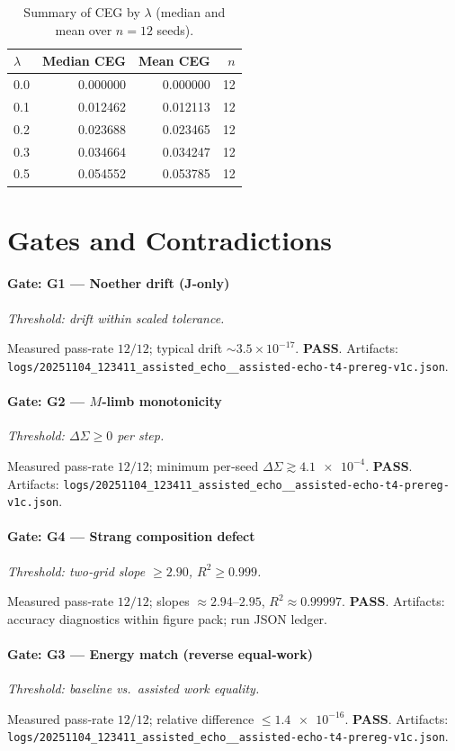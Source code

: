 \documentclass{article}
\newenvironment{vdmgate}[2]{%
  \paragraph{Gate: #1} \emph{Threshold: #2.}%
  \par\noindent}{\medskip}
\begin{document}
\begin{table}[t]
  \centering
  \caption{Summary of CEG by $\lambda$ (median and mean over $n=12$ seeds).}
  \label{tab:cegtable}
  \begin{tabular}{@{}lrrr@{}}
  \toprule
  $\lambda$ & Median CEG & Mean CEG & $n$ \\
  \midrule
  0.0 & 0.000000 & 0.000000 & 12 \\
  0.1 & 0.012462 & 0.012113 & 12 \\
  0.2 & 0.023688 & 0.023465 & 12 \\
  0.3 & 0.034664 & 0.034247 & 12 \\
  0.5 & 0.054552 & 0.053785 & 12 \\
  \bottomrule
  \end{tabular}
\end{table}

\section{Gates and Contradictions}
\label{sec:gates}

\begin{vdmgate}{G1 — Noether drift (J-only)}{drift within scaled tolerance}
Measured pass‑rate $12/12$; typical drift $\sim 3.5\times 10^{-17}$. \textbf{PASS}. Artifacts: \texttt{logs/20251104\_123411\_assisted\_echo\_\_assisted-echo-t4-prereg-v1c.json}.
\end{vdmgate}

\begin{vdmgate}{G2 — $M$‑limb monotonicity}{$\Delta \Sigma \ge 0$ per step}
Measured pass‑rate $12/12$; minimum per‑seed $\Delta \Sigma \gtrsim \num{4.1e-4}$. \textbf{PASS}. Artifacts: \texttt{logs/20251104\_123411\_assisted\_echo\_\_assisted-echo-t4-prereg-v1c.json}.
\end{vdmgate}

\begin{vdmgate}{G4 — Strang composition defect}{two‑grid slope $\ge 2.90$, $R^2 \ge 0.999$}
Measured pass‑rate $12/12$; slopes $\approx 2.94$–$2.95$, $R^2 \approx 0.99997$. \textbf{PASS}. Artifacts: accuracy diagnostics within figure pack; run JSON ledger.
\end{vdmgate}

\begin{vdmgate}{G3 — Energy match (reverse equal‑work)}{baseline vs.\ assisted work equality}
Measured pass‑rate $12/12$; relative difference $\le \num{1.4e-16}$. \textbf{PASS}. Artifacts: \texttt{logs/20251104\_123411\_assisted\_echo\_\_assisted-echo-t4-prereg-v1c.json}.
\end{vdmgate}
\end{document}
